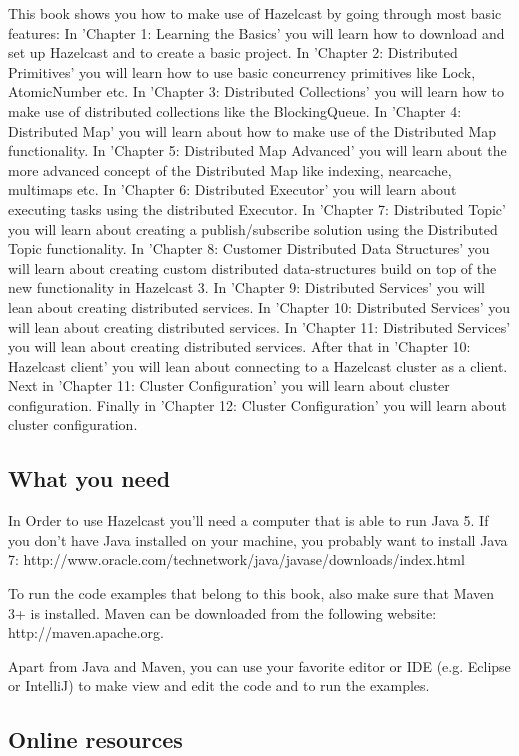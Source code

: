 This book shows you how to make use of Hazelcast by going through most basic features:
In 'Chapter 1: Learning the Basics' you will learn how to download and set up Hazelcast and to create a basic project.
In 'Chapter 2: Distributed Primitives' you will learn how to use basic concurrency primitives like Lock, AtomicNumber etc.
In 'Chapter 3: Distributed Collections' you will learn how to make use of distributed collections like the BlockingQueue.
In 'Chapter 4: Distributed Map' you will learn about how to make use of the Distributed Map functionality.
In 'Chapter 5: Distributed Map Advanced' you will learn about the more advanced concept of the Distributed Map like indexing, nearcache, multimaps etc.
In 'Chapter 6: Distributed Executor' you will learn about executing tasks using the distributed Executor.
In 'Chapter 7: Distributed Topic' you will learn about creating a publish/subscribe solution using the Distributed Topic functionality.
In 'Chapter 8: Customer Distributed Data Structures' you will learn about creating custom distributed data-structures build on top of the new functionality in Hazelcast 3.
In 'Chapter 9: Distributed Services' you will lean about creating distributed services.
In 'Chapter 10: Distributed Services' you will lean about creating distributed services.
In 'Chapter 11: Distributed Services' you will lean about creating distributed services.
After that in  'Chapter 10: Hazelcast client' you will lean about connecting to a Hazelcast cluster as a client.
Next in 'Chapter 11: Cluster Configuration' you will learn about cluster configuration.
Finally in 'Chapter 12: Cluster Configuration' you will learn about cluster configuration.

\subsection*{What you need}
In Order to use Hazelcast you'll need a computer that is able to run Java 5. If you don't have Java installed on your machine, you probably want to install Java 7: 
http://www.oracle.com/technetwork/java/javase/downloads/index.html

To run the code examples that belong to this book, also make sure that Maven 3+ is installed. Maven can be downloaded from the following website: 
http://maven.apache.org.

Apart from Java and Maven, you can use your favorite editor or IDE (e.g. Eclipse or IntelliJ) to make view and edit the code and to run the examples. 

\subsection*{Online resources}

